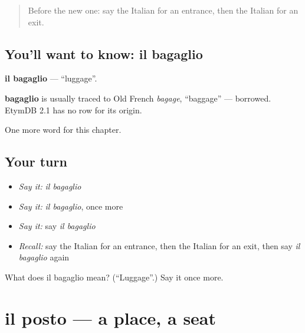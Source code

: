 \label{lesson:IT-C227-bagaglio}



\begin{quote}
Before the new one: say the Italian for an entrance, then the Italian for an exit.
\end{quote}

\subsection*{You'll want to know: il bagaglio}
\textbf{il bagaglio} — \textquotedblleft{}luggage\textquotedblright{}.

\begin{cousinweb}
\textbf{bagaglio} is usually traced to Old French \emph{bagage}, \textquotedblleft{}baggage\textquotedblright{} — borrowed. EtymDB 2.1 has no row for its origin.
\end{cousinweb}

\begin{grammarlens}[title={What you've built}]
One more word for this chapter.
\end{grammarlens}

\subsection*{Your turn}
\begin{itemize}
\raggedright
  \item \emph{Say it:} \emph{il bagaglio}
  \item \emph{Say it:} \emph{il bagaglio}, once more
  \item \emph{Say it:} say \emph{il bagaglio}
  \item \emph{Recall:} say the Italian for an entrance, then the Italian for an exit, then say \emph{il bagaglio} again
\end{itemize}

\begin{tcolorbox}[breakable,colback=teal!4,colframe=teal!35!black,title={Before you move on}]
What does il bagaglio mean? (\textquotedblleft{}Luggage\textquotedblright{}.) Say it once more.
\end{tcolorbox}
\section[il posto]{il posto — a place, a seat}

\label{lesson:IT-C227-posto}



